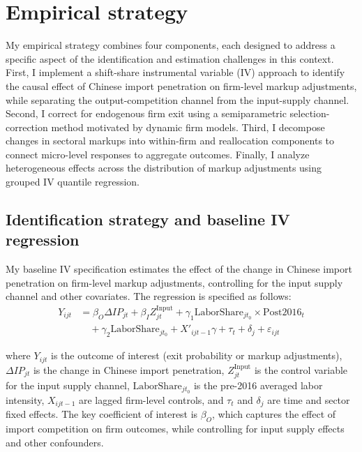 \documentclass[12pt]{article}
\begin{document}
\section{Empirical strategy}
My empirical strategy combines four components, each designed to address a specific aspect of the identification and estimation challenges in this context. First, I implement a shift-share instrumental variable (IV) approach to identify the causal effect of Chinese import penetration on firm-level markup adjustments, while separating the output-competition channel from the input-supply channel. Second, I correct for endogenous firm exit using a semiparametric selection-correction method motivated by dynamic firm models. Third, I decompose changes in sectoral markups into within-firm and reallocation components to connect micro-level responses to aggregate outcomes. Finally, I analyze heterogeneous effects across the distribution of markup adjustments using grouped IV quantile regression. 

\subsection{Identification strategy and baseline IV regression}

My baseline IV specification estimates the effect of the change in Chinese import penetration on firm-level markup adjustments, controlling for the input supply channel and other covariates. The regression is specified as follows:
\begin{equation}
\begin{aligned}
Y_{ijt} &= \beta_O \Delta IP_{jt} + \beta_I Z_{jt}^{\text{Input}} + \gamma_1 \text{LaborShare}_{jt_0} \times \text{Post2016}_t \\
&\quad + \gamma_2 \text{LaborShare}_{jt_0} + X'_{ijt-1} \gamma + \tau_t + \delta_j + \varepsilon_{ijt}
\end{aligned}
\end{equation}

where $Y_{ijt}$ is the outcome of interest (exit probability or markup adjustments), $\Delta IP_{jt}$ is the change in Chinese import penetration, $Z_{jt}^{\text{Input}}$ is the control variable for the input supply channel, $\text{LaborShare}_{jt_0}$ is the pre-2016 averaged labor intensity, $X_{ijt-1}$ are lagged firm-level controls, and $\tau_t$ and $\delta_j$ are time and sector fixed effects. The key coefficient of interest is $\beta_O$, which captures the effect of import competition on firm outcomes, while controlling for input supply effects and other confounders.
\end{document}
